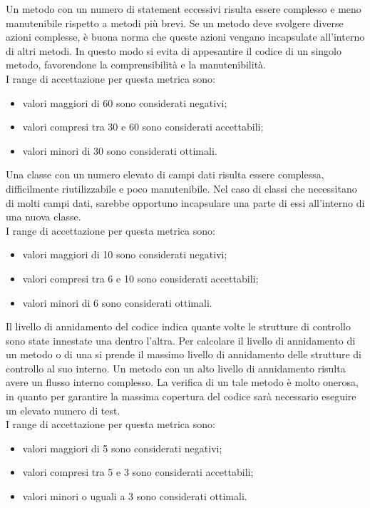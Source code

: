			Un metodo con un numero di statement eccessivi risulta essere complesso e meno manutenibile rispetto a metodi più brevi. Se un metodo deve svolgere diverse azioni complesse, è buona norma che queste azioni vengano incapsulate all'interno di altri metodi. In questo modo si evita di appesantire il codice di un singolo metodo, favorendone la comprensibilità e la manutenibilità.\\
			I range di accettazione per questa metrica sono:
				\begin{itemize}
					\item valori maggiori di 60 sono considerati negativi;
					\item valori compresi tra 30 e 60 sono considerati accettabili;
					\item valori minori di 30 sono considerati ottimali.
				\end{itemize}
			Una classe con un numero elevato di campi dati risulta essere complessa, difficilmente riutilizzabile e poco manutenibile. Nel caso di classi che necessitano di molti campi dati, sarebbe opportuno incapsulare una parte di essi all'interno di una nuova classe.\\
			I range di accettazione per questa metrica sono:
				\begin{itemize}
					\item valori maggiori di 10 sono considerati negativi;
					\item valori compresi tra 6 e 10 sono considerati accettabili;
					\item valori minori di 6 sono considerati ottimali.
				\end{itemize}
			Il livello di annidamento del codice indica quante volte le strutture di controllo sono state innestate una dentro l'altra. Per calcolare il livello di annidamento di un metodo o di una  si prende il massimo livello di annidamento delle strutture di controllo al suo interno. Un metodo con un alto livello di annidamento risulta avere un flusso interno complesso. La verifica di un tale metodo è molto onerosa, in quanto per garantire la massima copertura del codice sarà necessario eseguire un elevato numero di test.\\
			I range di accettazione per questa metrica sono:
			\begin{itemize}
				\item valori maggiori di 5 sono considerati negativi;
				\item valori compresi tra 5 e 3 sono considerati accettabili;
				\item valori minori o uguali a 3 sono considerati ottimali.
			\end{itemize}
